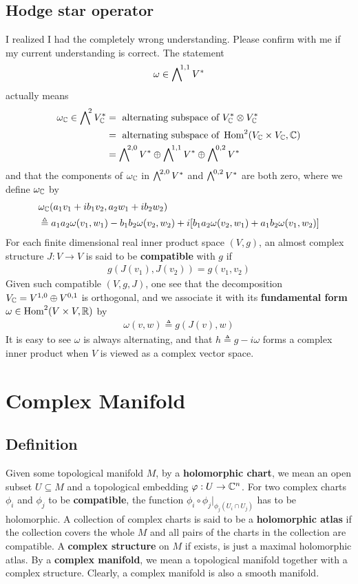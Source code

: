 \documentclass{report}
\begin{document}
\section{Hodge star operator}
I realized I had the completely wrong understanding. Please confirm with me if my current understanding is correct. The statement   
\begin{align}
\omega \in \extp^{1,1}V^*
\end{align}
actually means 
\begin{align}
  \omega_\C \in \extp^2 V_\C^* &=\text{ alternating subspace of } V_\C^* \otimes V_\C^* \\
  &=\text{ alternating subspace of }\operatorname{Hom}^2(V_\C\times V_\C ,\C)\\
  &=\extp^{2,0}V^* \oplus \extp^{1,1}V^* \oplus \extp^{0,2}V^*
\end{align}
and that the components of $\omega_{\mathbb{C}}$ in $\extp^{2,0}V^*$ and $\extp^{0,2}V^*$ are both zero, where we define $\omega_{\mathbb{C}}$ by 
\begin{align}
&\omega_{\mathbb{C}} (a_1v_1+ib_1v_2, a_2w_1+ib_2w_2)\\
&\triangleq a_1a_2\omega(v_1,w_1)-b_1b_2\omega(v_2,w_2)+ i[b_1a_2\omega (v_2,w_1)+a_1b_2\omega (v_1,w_2)]
\end{align}
For each finite dimensional real inner product space $(V,g)$, an almost complex structure $J:V\rightarrow V$ is said to be \textbf{compatible} with $g$ if 
\begin{align*}
g(J(v_1),J(v_2))=g(v_1,v_2)
\end{align*}
Given such compatible $(V,g,J)$, one see that the decomposition $V_{\mathbb{C}}=V^{1,0}\oplus V^{0,1}$ is orthogonal, and we associate it with its \textbf{fundamental form} $\omega\in \operatorname{Hom}^2(V\times V,\mathbb{R})$ by 
\begin{align*}
\omega (v,w)\triangleq  g(J(v),w)
\end{align*}
It is easy to see $\omega$ is always alternating, and that $h\triangleq g- i \omega$ forms a complex inner product when $V$ is viewed as a complex vector space. 

\chapter{Complex Manifold}
\section{Definition}
Given some topological manifold $M$, by a \textbf{holomorphic chart}, we mean an open subset $U\subseteq M$ and a topological embedding  $\varphi : U \rightarrow \mathbb{C}^n$. For two complex charts $\phi_i$ and $\phi_j$ to be \textbf{compatible}, the function $\phi_i \circ \phi_j |_{\phi_j (U_i \cap U_j)}$ has to be holomorphic. A collection of complex charts is said to be a \textbf{holomorphic atlas} if the collection covers the whole $M$ and all pairs of the charts in the collection are compatible.  A \textbf{complex structure} on $M$ if exists, is just a maximal holomorphic atlas. By a \textbf{complex manifold}, we mean a topological manifold together with a complex structure. Clearly, a complex manifold is also a smooth manifold. \\ 
\end{document}
